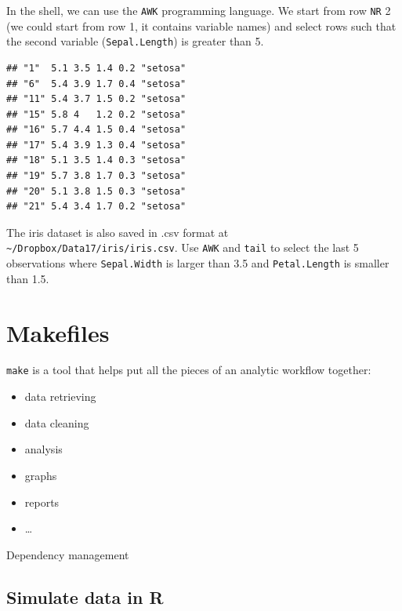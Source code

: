 \documentclass[]{book}
\newenvironment{Shaded}{\begin{snugshade}}{\end{snugshade}}
\newcommand{\KeywordTok}[1]{\textcolor[rgb]{0.13,0.29,0.53}{\textbf{#1}}}
\newcommand{\StringTok}[1]{\textcolor[rgb]{0.31,0.60,0.02}{#1}}
\newcommand{\FunctionTok}[1]{\textcolor[rgb]{0.00,0.00,0.00}{#1}}
\newcommand{\NormalTok}[1]{#1}
\providecommand{\tightlist}{%
  \setlength{\itemsep}{0pt}\setlength{\parskip}{0pt}}
\theoremstyle{definition}
\theoremstyle{definition}
\theoremstyle{definition}
\theoremstyle{remark}
\let\BeginKnitrBlock\begin \let\EndKnitrBlock\end
\begin{document}
In the shell, we can use the \texttt{AWK} programming language. We start
from row \texttt{NR} 2 (we could start from row 1, it contains variable
names) and select rows such that the second variable
(\texttt{Sepal.Length}) is greater than 5.

\begin{Shaded}
\end{Shaded}

\begin{verbatim}
## "1"  5.1 3.5 1.4 0.2 "setosa"
## "6"  5.4 3.9 1.7 0.4 "setosa"
## "11" 5.4 3.7 1.5 0.2 "setosa"
## "15" 5.8 4   1.2 0.2 "setosa"
## "16" 5.7 4.4 1.5 0.4 "setosa"
## "17" 5.4 3.9 1.3 0.4 "setosa"
## "18" 5.1 3.5 1.4 0.3 "setosa"
## "19" 5.7 3.8 1.7 0.3 "setosa"
## "20" 5.1 3.8 1.5 0.3 "setosa"
## "21" 5.4 3.4 1.7 0.2 "setosa"
\end{verbatim}

\BeginKnitrBlock{exercise}
\protect\hypertarget{exr:unnamed-chunk-11}{}{\label{exr:unnamed-chunk-11}
}The iris dataset is also saved in .csv format at
\texttt{\textasciitilde{}/Dropbox/Data17/iris/iris.csv}. Use
\texttt{AWK} and \texttt{tail} to select the last 5 observations where
\texttt{Sepal.Width} is larger than 3.5 and \texttt{Petal.Length} is
smaller than 1.5.
\EndKnitrBlock{exercise}

\section{Makefiles}\label{makefiles}

\texttt{make} is a tool that helps put all the pieces of an analytic
workflow together:

\begin{itemize}
\tightlist
\item
  data retrieving
\item
  data cleaning
\item
  analysis
\item
  graphs
\item
  reports
\item
  \ldots{}
\end{itemize}

Dependency management

\subsection{Simulate data in R}\label{simulate-data-in-r}
\end{document}
